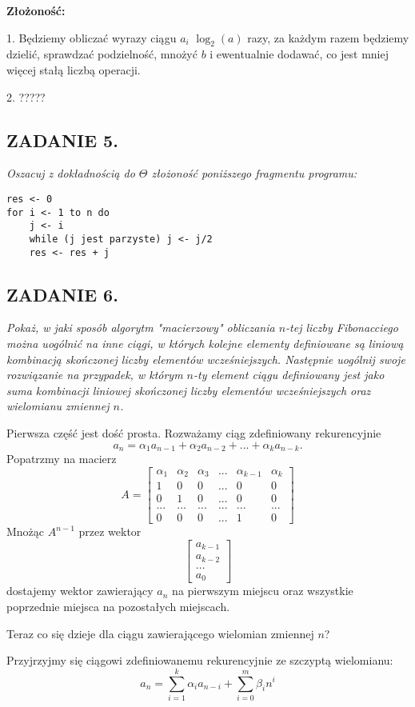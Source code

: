 \documentclass{article}
\begin{document}
\textbf{Złożoność:}

1. Będziemy obliczać wyrazy ciągu $a_i$ $\log_2(a)$ razy, za każdym razem będziemy dzielić, sprawdzać podzielność, mnożyć $b$ i ewentualnie dodawać, co jest mniej więcej stałą liczbą operacji.

2. {\color{orange}?????}

\subsection*{ZADANIE 5.}
\emph{Oszacuj z dokładnością do $\Theta$ złożoność poniższego fragmentu programu:}
\begin{lstlisting}
res <- 0
for i <- 1 to n do
    j <- i
    while (j jest parzyste) j <- j/2
    res <- res + j
\end{lstlisting}

\subsection*{ZADANIE 6.}
\emph{Pokaż, w jaki sposób algorytm "macierzowy" obliczania $n$-tej liczby Fibonacciego można uogólnić na inne ciągi, w których kolejne elementy definiowane są liniową kombinacją skończonej liczby elementów wcześniejszych. Następnie uogólnij swoje rozwiązanie na przypadek, w którym $n$-ty element ciągu definiowany jest jako suma kombinacji liniowej skończonej liczby elementów wcześniejszych oraz wielomianu zmiennej $n$.}
\medskip

Pierwsza część jest dość prosta. Rozważamy ciąg zdefiniowany rekurencyjnie
$$a_n=\alpha_1a_{n-1}+\alpha_2a_{n-2}+...+\alpha_ka_{n-k}.$$
Popatrzmy na macierz
$$A=\begin{bmatrix}
    \alpha_1 & \alpha_2 & \alpha_3 & ... &\alpha_{k-1} & \alpha_k\\
    1 & 0 & 0 & ... & 0 & 0\\
    0 & 1 & 0 & ... & 0 & 0\\
    ... & ... & ... & ... & ... & ...\\
    0 & 0 & 0 & ... & 1 & 0
\end{bmatrix}$$
Mnożąc $A^{n-1}$ przez wektor
$$\begin{bmatrix}
    a_{k-1}\\
    a_{k-2}\\
    ...\\
    a_0
\end{bmatrix}$$
dostajemy wektor zawierający $a_n$ na pierwszym miejscu oraz wszystkie poprzednie miejsca na pozostałych miejscach.
\smallskip

Teraz co się dzieje dla ciągu zawierającego wielomian zmiennej $n$?

Przyjrzyjmy się ciągowi zdefiniowanemu rekurencyjnie ze szczyptą wielomianu:
$$a_n=\sum\limits_{i=1}^k\alpha_ia_{n-i}+\sum\limits_{i=0}^m\beta_in^i$$
\end{document}
